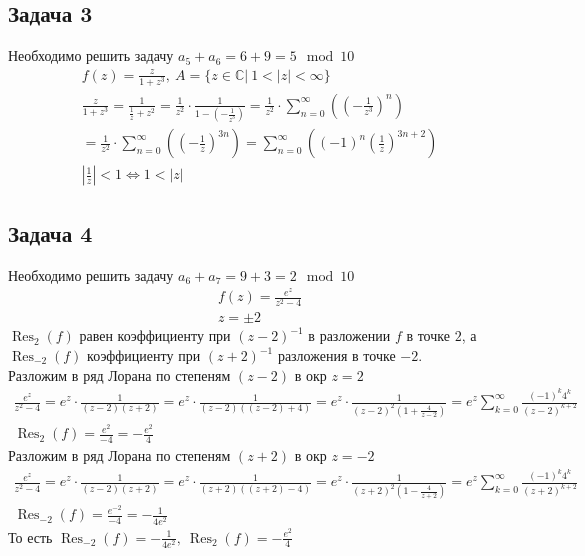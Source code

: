 \subsection*{Задача 3}
	Необходимо решить задачу $a_5 + a_6 = 6 + 9 = 5 \mod 10$
	\begin{gather*}
		f(z) = \frac{z}{1 + z^3},\ A=\{z \in \mathbb{C}|\ 1 < |z| < \infty\}\\
		\frac{z}{1+z^3}
		= \frac{1}{\frac{1}{z} + z^2}
		= \frac{1}{z^2} \cdot \frac{1}{1 - (-\frac{1}{z^3})}
		= \frac{1}{z^2} \cdot \sum\limits_{n = 0}^{\infty} \left( \left(-\frac{1}{z^3}\right)^n\right)\\
		= \frac{1}{z^2} \cdot \sum\limits_{n = 0}^{\infty} \left( \left(-\frac{1}{z}\right)^{3n}\right)
		= \sum\limits_{n = 0}^{\infty} \left( (-1)^{n}\left(\frac{1}{z}\right)^{3n+2}\right)\\
		\left|\frac{1}{z}\right| < 1
		\Leftrightarrow 1 < |z|
	\end{gather*}
\vskip 0.4in

\subsection*{Задача 4}
	Необходимо решить задачу $a_6 + a_7 = 9 + 3 = 2 \mod 10$
	\begin{gather*}
		f(z) = \frac{e^z}{z^2 - 4}\\
		z = \pm 2
	\end{gather*}
	$\operatorname{Res}_{2}(f)$ равен коэффициенту при $(z - 2)^{-1}$ в разложении $f$ в точке $2$, а $\operatorname{Res}_{-2}(f)$ коэффициенту при $(z + 2)^{-1}$ разложения в точке $-2$.\\
	Разложим в ряд Лорана по степеням $(z - 2)$ в окр $z = 2$
	\begin{gather*}
		\frac{e^z}{z^2 - 4}
		= e^z \cdot \frac{1}{(z - 2)(z + 2)}
		= e^z \cdot \frac{1}{(z - 2)((z - 2) + 4)}
		= e^z \cdot \frac{1}{(z - 2)^2 (1 + \frac{4}{z - 2})}
		= e^z \sum\limits_{k = 0}^{\infty} \frac{(-1)^k 4^k}{(z - 2)^{k+2}}\\
		\operatorname{Res}_{2}(f) = \frac{e^{2}}{-4} = -\frac{e^{2}}{4}
	\end{gather*}
	Разложим в ряд Лорана по степеням $(z + 2)$ в окр $z = -2$
	\begin{gather*}
		\frac{e^z}{z^2 - 4}
		= e^z \cdot \frac{1}{(z - 2)(z + 2)}
		= e^z \cdot \frac{1}{(z + 2)((z + 2) - 4)}
		= e^z \cdot \frac{1}{(z + 2)^2 (1 - \frac{4}{z + 2})}
		= e^z \sum\limits_{k = 0}^{\infty} \frac{(-1)^k 4^k}{(z + 2)^{k+2}}\\
		\operatorname{Res}_{-2}(f) = \frac{e^{-2}}{-4} = -\frac{1}{4e^{2}}
	\end{gather*}
	То есть $\operatorname{Res}_{-2}(f) = -\frac{1}{4e^{2}},\ \operatorname{Res}_{2}(f) = -\frac{e^{2}}{4}$

